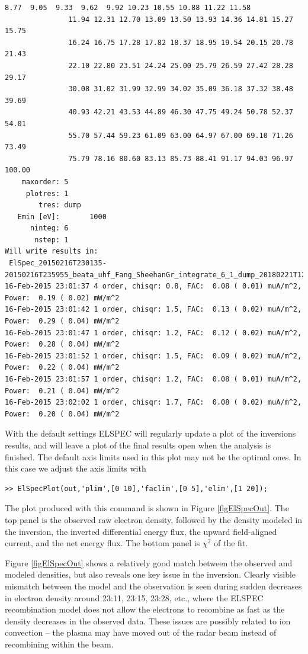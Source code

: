 \documentclass[12pt,a4paper]{report}
\begin{document}
\begin{lstlisting}[style=myMATLABsmall]
                8.77  9.05  9.33  9.62  9.92 10.23 10.55 10.88 11.22 11.58
               11.94 12.31 12.70 13.09 13.50 13.93 14.36 14.81 15.27 15.75
               16.24 16.75 17.28 17.82 18.37 18.95 19.54 20.15 20.78 21.43
               22.10 22.80 23.51 24.24 25.00 25.79 26.59 27.42 28.28 29.17
               30.08 31.02 31.99 32.99 34.02 35.09 36.18 37.32 38.48 39.69
               40.93 42.21 43.53 44.89 46.30 47.75 49.24 50.78 52.37 54.01
               55.70 57.44 59.23 61.09 63.00 64.97 67.00 69.10 71.26 73.49
               75.79 78.16 80.60 83.13 85.73 88.41 91.17 94.03 96.97 100.00
    maxorder: 5
     plotres: 1
        tres: dump
   Emin [eV]:       1000
      ninteg: 6
       nstep: 1
Will write results in:
 ElSpec_20150216T230135-20150216T235955_beata_uhf_Fang_SheehanGr_integrate_6_1_dump_20180221T123708.mat
16-Feb-2015 23:01:37 4 order, chisqr: 0.8, FAC:  0.08 ( 0.01) muA/m^2, Power:  0.19 ( 0.02) mW/m^2
16-Feb-2015 23:01:42 1 order, chisqr: 1.5, FAC:  0.13 ( 0.02) muA/m^2, Power:  0.29 ( 0.04) mW/m^2
16-Feb-2015 23:01:47 1 order, chisqr: 1.2, FAC:  0.12 ( 0.02) muA/m^2, Power:  0.28 ( 0.04) mW/m^2
16-Feb-2015 23:01:52 1 order, chisqr: 1.5, FAC:  0.09 ( 0.02) muA/m^2, Power:  0.22 ( 0.04) mW/m^2
16-Feb-2015 23:01:57 1 order, chisqr: 1.2, FAC:  0.08 ( 0.01) muA/m^2, Power:  0.21 ( 0.04) mW/m^2
16-Feb-2015 23:02:02 1 order, chisqr: 1.7, FAC:  0.08 ( 0.02) muA/m^2, Power:  0.20 ( 0.04) mW/m^2

\end{lstlisting}

With the default settings ELSPEC will regularly update a plot of the inversions results, and will leave a plot of the final results open when the analysis is finished. The default axis limits used in this plot may not be the optimal ones. In this case we adjust the axis limits with
\begin{lstlisting}[style=myMATLAB]
>> ElSpecPlot(out,'plim',[0 10],'faclim',[0 5],'elim',[1 20]);
\end{lstlisting}

The plot produced with this command is shown in Figure \ref{figElSpecOut}. The top panel is the observed raw electron density, followed by the density modeled in the inversion, the inverted differential energy flux, the upward field-aligned current, and the net energy flux. The bottom panel is $\chi^2$ of the fit. 

Figure \ref{figElSpecOut} shows a relatively good match between the observed and modeled densities, but also reveals one key issue in the inversion. Clearly visible mismatch between the model and the observation is seen during sudden decreases in electron density around 23:11, 23:15, 23:28, etc., where the ELSPEC recombination model does not allow the electrons to recombine as fast as the density decreases in the observed data. These issues are possibly related to ion convection -- the plasma may have moved out of the radar beam instead of recombining within the beam. 
\end{document}
